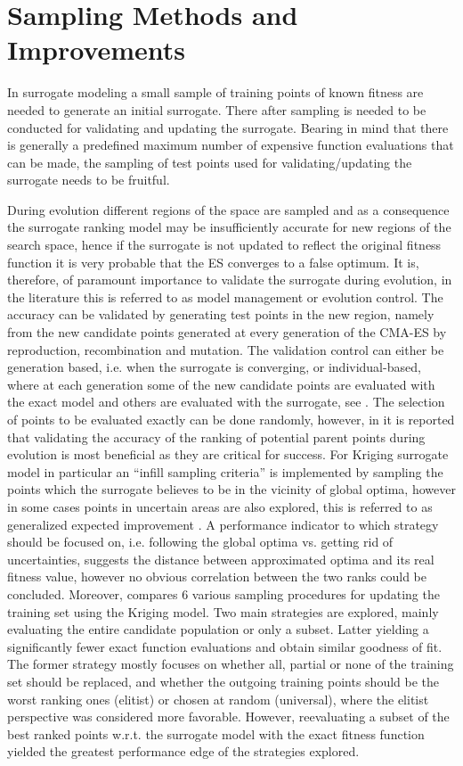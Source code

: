 \documentclass[conference]{IEEEtran}
\begin{document}
\section{Sampling Methods and Improvements}\label{sec:samplingstopping}
In surrogate modeling a small sample of training points of known fitness are needed to generate an initial surrogate. There after sampling is needed to be conducted for validating and updating the surrogate. Bearing in mind that there is generally a predefined maximum number of expensive function evaluations that can be made, the sampling of test points used for validating/updating the surrogate needs to be fruitful. 

During evolution different regions of the space are sampled and as a consequence the surrogate ranking model may be insufficiently accurate for new regions of the search space, hence if the surrogate is not updated to reflect the original fitness function it is very probable that the ES converges to a false optimum. It is, therefore, of paramount importance to validate the surrogate during evolution, in the literature this is referred to as model management or evolution control. The accuracy can be validated by generating test points in the new region, namely from the new candidate points generated at every generation of the CMA-ES by reproduction, recombination and mutation. The validation control can either be generation based, i.e. when the surrogate is converging, or individual-based, where  at each generation some of the new candidate points are evaluated with the exact model and others are evaluated with the surrogate, see \cite{Jin05}. The selection of points to be evaluated exactly can be done randomly, however, in \cite{Ru04:PPSN} it is reported that validating the accuracy of the ranking of potential parent points during evolution is most beneficial as they are critical for success. For Kriging surrogate model in particular an ``infill sampling criteria'' is implemented by sampling the points which the surrogate believes to be in the vicinity of global optima, however in some cases points in uncertain areas are also explored, this is referred to as generalized expected improvement \cite{Sasena2002}. A performance indicator to which strategy should be focused on, i.e. following the global optima vs. getting rid of uncertainties, \cite{Ponweiser2008} suggests the distance between approximated optima and its real fitness value, however no obvious correlation between the two ranks could be concluded. Moreover, \cite{Ratle1999} compares 6 various sampling procedures for updating the training set using the Kriging model. Two main strategies are explored, mainly evaluating the entire candidate population or only a subset. Latter yielding a significantly fewer exact function evaluations and obtain similar goodness of fit. The former strategy mostly focuses on whether all, partial or none of the training set should be replaced, and whether the outgoing training points should be the worst ranking ones (elitist) or chosen at random (universal), where the elitist perspective was considered more favorable. However, reevaluating a subset of the best ranked points w.r.t. the surrogate model with the exact fitness function yielded the greatest performance edge of the strategies explored. 
\end{document}
